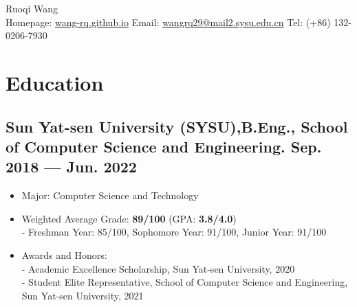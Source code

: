 \documentclass[a4,11pt]{article}
\newenvironment{zitemize}{
\begin{itemize}\itemsep0pt \parskip0pt \parsep1pt}
{\end{itemize}\vspace{-0.5cm}}
\begin{document}
\begin{center}

    \begin{minipage}[b]{0.9\textwidth}
            \centering
            {\Huge Ruoqi Wang} \\ %
            \vspace{0.2cm}
			   Homepage: \href{https://wang-rq.github.io}{wang-rq.github.io} \space \space \space \space \space \space \space \space \space \space \space \space
Email: \href{mailto:wangrq29@mail2.sysu.edu.cn}{wangrq29@mail2.sysu.edu.cn} \space \space \space \space \space \space \space \space \space \space \space \space 
Tel: (+86) 132-0206-7930 
	\vspace{0.1cm}
    \end{minipage}%

    
\vspace{-0.15cm} 

\end{center}




\section{\large \textbf{Education}}

\subsection*{Sun Yat-sen University (SYSU),\space \space \space \space  B.Eng., \space \space \space \space    School of Computer Science and Engineering. \hfill Sep. 2018 --- Jun. 2022 } 
    \begin{zitemize}
        \item Major: Computer Science and Technology
		\item Weighted Average Grade: \textbf{89/100} (GPA: \textbf{3.8/4.0}) \\
		 - \space \space Freshman Year: 85/100, \space \space Sophomore Year: 91/100, \space \space Junior Year: 91/100
		\item Awards and Honors: \\
		 - \space \space Academic Excellence Scholarship, Sun Yat-sen University, 2020\\
		- \space \space Student Elite Representative, School of Computer Science and Engineering, Sun Yat-sen University, 2021\\
		

    \end{zitemize}
\vspace{0.2cm}
\end{document}
